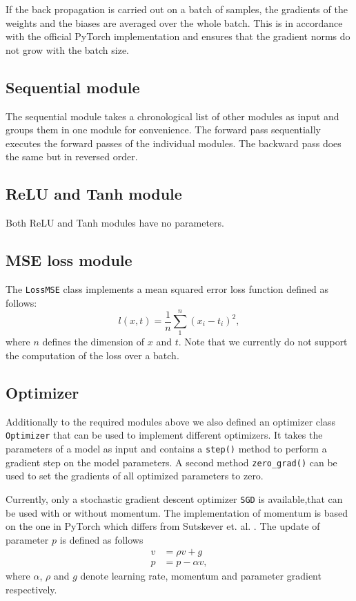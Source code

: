 \documentclass[10pt,conference,compsocconf]{IEEEtran}
\begin{document}
If the back propagation is carried out on a batch of samples, the gradients of the weights and the biases are averaged over the whole batch. This is in accordance with the official PyTorch implementation and ensures that the gradient norms do not grow with the batch size. 

\subsection{Sequential module}
The sequential module takes a chronological list of other modules as input and groups them in one module for convenience. The forward pass sequentially executes the forward passes of the individual modules. The backward pass does the same but in reversed order.

\subsection{ReLU and Tanh module}
Both ReLU and Tanh modules have no parameters.

\subsection{MSE loss module}
The \texttt{LossMSE} class implements a mean squared error loss function defined as follows:
\begin{equation} \label{eq:MSE}
  l(x,t) = \frac{1}{n} \sum_1^n{(x_i - t_i)^2}, 
\end{equation}
where $n$ defines the dimension of $x$ and $t$. Note that we currently do not support the computation of the loss over a batch.

\subsection{Optimizer}
Additionally to the required modules above we also defined an optimizer class \texttt{Optimizer} that can be used to implement different optimizers. It takes the parameters of a model as input and contains a \texttt{step()} method to perform a gradient step on the model parameters. A second method \texttt{zero\_grad()} can be used to set the gradients of all optimized parameters to zero. 

Currently, only a stochastic gradient descent optimizer \texttt{SGD} is available,that can be used with or without momentum. The implementation of momentum is based on the one in PyTorch which differs from Sutskever et. al. \cite{sutskever2013importance}. The update of parameter $p$ is defined as follows 
\begin{equation} \label{eq:SGDmoment}
  \begin{aligned}
    v &= \rho v + g \\
    p &= p - \alpha v,
  \end{aligned}
\end{equation}
where $\alpha$, $\rho$ and $g$ denote learning rate, momentum and parameter gradient respectively.
\end{document}
